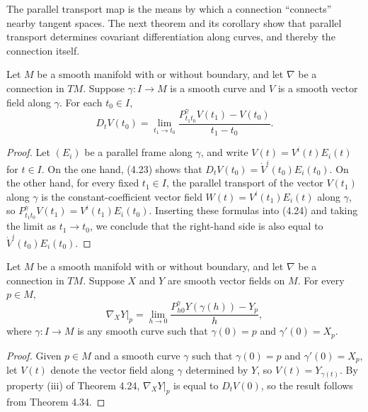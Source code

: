 The parallel transport map is the means by which a connection ``connects'' nearby tangent spaces. The next theorem and its corollary show that parallel transport determines covariant differentiation along curves, and thereby the connection itself.

\begin{theorem}
\label{thm:parallel-transport-determines-covariant-diff}
Let $M$ be a smooth manifold with or without boundary, and let $\nabla$ be a connection in $TM$. Suppose $\gamma : I \to M$ is a smooth curve and $V$ is a smooth vector field along $\gamma$. For each $t_0 \in I$,
\begin{equation}
D_t V(t_0) = \lim_{t_1 \to t_0} \frac{P_{t_1 t_0}^{\gamma} V(t_1) - V(t_0)}{t_1 - t_0}. \tag{4.24}
\end{equation}
\end{theorem}

\begin{proof}
Let $(E_i)$ be a parallel frame along $\gamma$, and write $V(t) = V^i(t) E_i(t)$ for $t \in I$. On the one hand, (4.23) shows that $D_t V(t_0) = \dot{V}^i(t_0) E_i(t_0)$. On the other hand, for every fixed $t_1 \in I$, the parallel transport of the vector $V(t_1)$ along $\gamma$ is the constant-coefficient vector field $W(t) = V^i(t_1) E_i(t)$ along $\gamma$, so $P_{t_1 t_0}^{\gamma} V(t_1) = V^i(t_1) E_i(t_0)$. Inserting these formulas into (4.24) and taking the limit as $t_1 \to t_0$, we conclude that the right-hand side is also equal to $\dot{V}^i(t_0) E_i(t_0)$.
\end{proof}

\begin{corollary}
\label{cor:parallel-transport-determines-connection}
Let $M$ be a smooth manifold with or without boundary, and let $\nabla$ be a connection in $TM$. Suppose $X$ and $Y$ are smooth vector fields on $M$. For every $p \in M$,
\begin{equation}
\nabla_X Y|_p = \lim_{h \to 0} \frac{P_{h0}^{\gamma} Y(\gamma(h)) - Y_p}{h}, \tag{4.25}
\end{equation}
where $\gamma : I \to M$ is any smooth curve such that $\gamma(0) = p$ and $\gamma'(0) = X_p$.
\end{corollary}

\begin{proof}
Given $p \in M$ and a smooth curve $\gamma$ such that $\gamma(0) = p$ and $\gamma'(0) = X_p$, let $V(t)$ denote the vector field along $\gamma$ determined by $Y$, so $V(t) = Y_{\gamma(t)}$. By property (iii) of Theorem 4.24, $\nabla_X Y |_p$ is equal to $D_t V(0)$, so the result follows from Theorem 4.34.
\end{proof}

